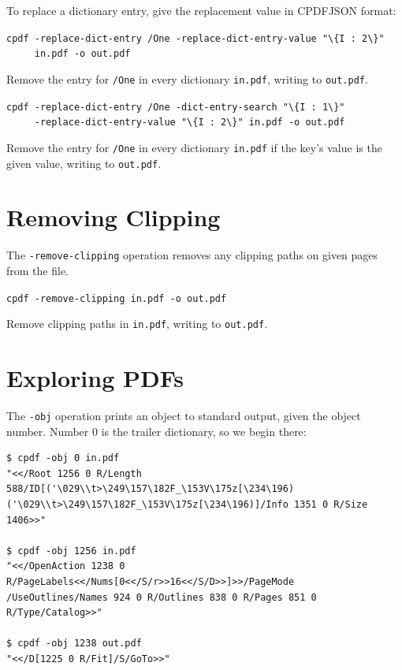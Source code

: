 \documentclass{book}
\begin{document}
\noindent To replace a dictionary entry, give the replacement value in CPDFJSON format:

  \begin{framed}
  \small\noindent\verb!cpdf -replace-dict-entry /One -replace-dict-entry-value "\{I : 2\}"!\\
  \small\noindent\verb!     in.pdf -o out.pdf!

  \vspace{2.5mm}
  \noindent Remove the entry for \texttt{/One} in every dictionary \texttt{in.pdf}, writing to \texttt{out.pdf}. 

  \vspace{2.5mm}

  \small\noindent\verb!cpdf -replace-dict-entry /One -dict-entry-search "\{I : 1\}"!\\
  \small\noindent\verb!     -replace-dict-entry-value "\{I : 2\}" in.pdf -o out.pdf!

  \vspace{2.5mm}
  \noindent Remove the entry for \texttt{/One} in every dictionary \texttt{in.pdf} if the key's value is the given value, writing to \texttt{out.pdf}. 
  \end{framed}

\section{Removing Clipping}


The \texttt{-remove-clipping} operation removes any clipping paths on given pages from the file.

  \begin{framed}
  \small\noindent\verb!cpdf -remove-clipping in.pdf -o out.pdf!

  \vspace{2.5mm}
  \noindent Remove clipping paths in \texttt{in.pdf}, writing to \texttt{out.pdf}. 
  \end{framed}

\section{Exploring PDFs}

\noindent The \texttt{-obj} operation prints an object to standard output, given the object number. Number 0 is the trailer dictionary, so we begin there:

{\small\begin{verbatim}
$ cpdf -obj 0 in.pdf
"<</Root 1256 0 R/Length 588/ID[('\029\\t>\249\157\182F_\153V\175z[\234\196)
('\029\\t>\249\157\182F_\153V\175z[\234\196)]/Info 1351 0 R/Size 1406>>"

$ cpdf -obj 1256 in.pdf
"<</OpenAction 1238 0 R/PageLabels<</Nums[0<</S/r>>16<</S/D>>]>>/PageMode
/UseOutlines/Names 924 0 R/Outlines 838 0 R/Pages 851 0 R/Type/Catalog>>"

$ cpdf -obj 1238 out.pdf
"<</D[1225 0 R/Fit]/S/GoTo>>"
\end{verbatim}}
\end{document}
